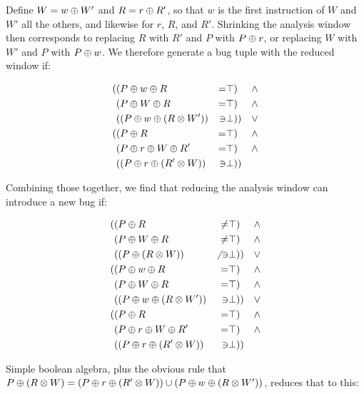 Define $W = w \oplus W'$ and $R = r \oplus R'$, so
that $w$ is the first instruction of $W$ and $W'$ all the others, and
likewise for $r$, $R$, and $R'$.  Shrinking the analysis window then
corresponds to replacing $R$ with $R'$ and $P$ with $P
\oplus r$, or replacing $W$ with $W'$ and $P$ with $P
\oplus w$.  We therefore generate a bug tuple with the
reduced window if:

\begin{align*}
( & (P \oplus w \oplus R & = & \top) & \wedge \\
  & (P \oplus W \oplus R & = & \top) & \wedge \\
  & ((P \oplus w \oplus (R \otimes W')) & \ni & \bot)) & \vee \\
( & (P \oplus R & = & \top) & \wedge \\
  & (P \oplus r \oplus W \oplus R' & = & \top) & \wedge \\
  & ((P \oplus r \oplus (R' \otimes W)) & \ni & \bot))
\end{align*}

Combining those together, we find that reducing the analysis window can introduce a new bug if:

\begin{align*}
( & (P \oplus R & \not= & \top) & \wedge \\
  & (P \oplus W \oplus R & \not= & \top) & \wedge \\
  & ((P \oplus (R \otimes W)) & \not{}\ni & \bot)) & \vee \\
( & (P \oplus w \oplus R & = & \top) & \wedge \\
  & (P \oplus W \oplus R & = & \top) & \wedge \\
  & ((P \oplus w \oplus (R \otimes W')) & \ni & \bot)) & \vee \\
( & (P \oplus R & = & \top) & \wedge \\
  & (P \oplus r \oplus W \oplus R' & = & \top) & \wedge \\
  & ((P \oplus r \oplus (R' \otimes W)) & \ni & \bot))
\end{align*}

Simple boolean algebra, plus the obvious rule that $P \oplus (R \otimes W) = (P \oplus r \oplus (R' \otimes W) ) \cup (P \oplus w \oplus (R \otimes W') ) $, reduces that to this:

